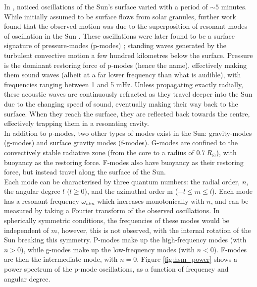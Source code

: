 \documentclass[11pt,a4paper,onecolumn]{report}
\begin{document}
In \citeyear{leighton_velocity_1962}, \citeauthor{leighton_velocity_1962}
noticed oscillations of the Sun's surface varied with a period of \(\sim
5\) minutes. While initially assumed to be surface flows from solar granules,
further work found that the observed motion was due to the superposition of
resonant modes of oscillation in the Sun \citep{ulrich_five-minute_1970}. These
oscillations were later found to be a surface signature of pressure-modes
(p-modes) \citep{deubner_observations_1975}; standing waves generated by the
turbulent convective motion a few hundred kilometres below the surface. Pressure
is the dominant restoring force of p-modes (hence the name), effectively making
them sound waves (albeit at a far lower frequency than what is audible), with
frequencies ranging between 1 and 5 mHz. Unless propagating exactly radially,
these acoustic waves are continuously refracted as they travel deeper into the
Sun due to the changing speed of sound, eventually making their way back to the
surface. When they reach the surface, they are reflected back towards the
centre, effectively trapping them in a resonating cavity. \\

In addition to p-modes, two other types of modes exist in the Sun: gravity-modes
(g-modes) and surface gravity modes (f-modes). G-modes are confined to the
convectively stable radiative zone (from the core to a radius of $\SI{0.7}
{R_\odot}$), with buoyancy as the restoring force. F-modes also have buoyancy as
their restoring force, but instead travel along the surface of the Sun. \\

Each mode can be characterised by three quantum numbers: the radial order,
\(n\), the angular degree \(l\) (\(l \geq 0\)), and the azimuthal order m (\(-l
\leq m \leq l\)). Each mode has a resonant frequency \(\omega_{nlm}\) which
increases monotonically with \(n\), and can be measured by taking a Fourier
transform of the observed oscillations. In spherically symmetric conditions, the
frequencies of these modes would be independent of \(m\), however, this is not
observed, with the internal rotation of the Sun breaking this symmetry. P-modes
make up the high-frequency modes (with \(n>0\)), while g-modes make up the
low-frequency modes (with \(n<0\)). F-modes are then the intermediate mode, with
\(n=0\). Figure \ref{fig:hsm_power} shows a power spectrum of the p-mode
oscillations, as a function of frequency and angular degree. \\
\end{document}
